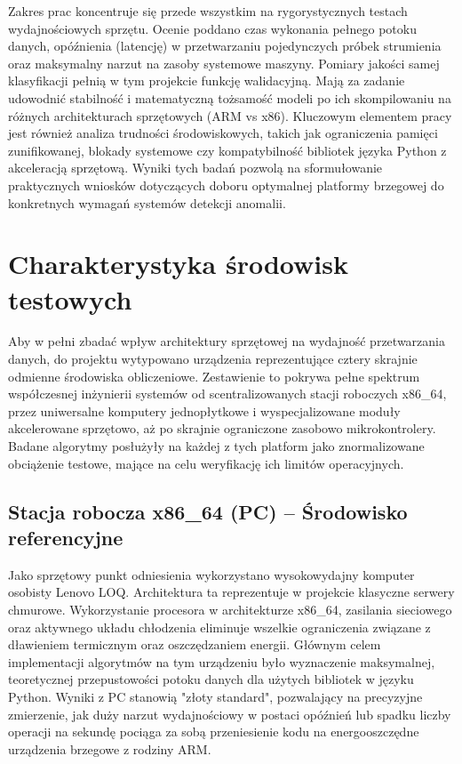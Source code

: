 \documentclass[12pt,twoside]{article}
\begin{document}
Zakres prac koncentruje się przede wszystkim na rygorystycznych testach wydajnościowych sprzętu. Ocenie poddano czas wykonania pełnego potoku danych, opóźnienia (latencję) w przetwarzaniu pojedynczych próbek strumienia oraz maksymalny narzut na zasoby systemowe maszyny. Pomiary jakości samej klasyfikacji pełnią w tym projekcie funkcję walidacyjną. Mają za zadanie udowodnić stabilność i matematyczną tożsamość modeli po ich skompilowaniu na różnych architekturach sprzętowych (ARM vs x86). Kluczowym elementem pracy jest również analiza trudności środowiskowych, takich jak ograniczenia pamięci zunifikowanej, blokady systemowe czy kompatybilność bibliotek języka Python z akceleracją sprzętową. Wyniki tych badań pozwolą na sformułowanie praktycznych wniosków dotyczących doboru optymalnej platformy brzegowej do konkretnych wymagań systemów detekcji anomalii.

\section{Charakterystyka środowisk testowych}
Aby w pełni zbadać wpływ architektury sprzętowej na wydajność przetwarzania danych, do projektu wytypowano urządzenia reprezentujące cztery skrajnie odmienne środowiska obliczeniowe. Zestawienie to pokrywa pełne spektrum współczesnej inżynierii systemów od scentralizowanych stacji roboczych x86\_64, przez uniwersalne komputery jednopłytkowe i wyspecjalizowane moduły akcelerowane sprzętowo, aż po skrajnie ograniczone zasobowo mikrokontrolery. Badane algorytmy posłużyły na każdej z tych platform jako znormalizowane obciążenie testowe, mające na celu weryfikację ich limitów operacyjnych.
\subsection{Stacja robocza x86\_64 (PC) – Środowisko referencyjne}
Jako sprzętowy punkt odniesienia wykorzystano wysokowydajny komputer osobisty Lenovo LOQ. Architektura ta reprezentuje w projekcie klasyczne serwery chmurowe. Wykorzystanie procesora w architekturze x86\_64, zasilania sieciowego oraz aktywnego układu chłodzenia eliminuje wszelkie ograniczenia związane z dławieniem termicznym oraz oszczędzaniem energii. Głównym celem implementacji algorytmów na tym urządzeniu było wyznaczenie maksymalnej, teoretycznej przepustowości potoku danych dla użytych bibliotek w języku Python. Wyniki z PC stanowią "złoty standard", pozwalający na precyzyjne zmierzenie, jak duży narzut wydajnościowy w postaci opóźnień lub spadku liczby operacji na sekundę pociąga za sobą przeniesienie kodu na energooszczędne urządzenia brzegowe z rodziny ARM.
\end{document}
